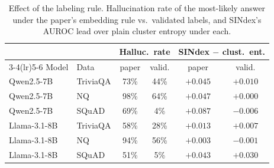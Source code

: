 \begin{table}[t]\centering
\caption{Effect of the labeling rule. Hallucination rate of the most-likely answer under the paper's embedding rule vs.\ validated labels, and SINdex's AUROC lead over plain cluster entropy under each.}
\label{tab:labeleffect}\small\setlength{\tabcolsep}{3.5pt}
\begin{tabular}{llcccc}\toprule
 & & \multicolumn{2}{c}{Halluc.\ rate} & \multicolumn{2}{c}{SINdex $-$ clust.\ ent.}\\
\cmidrule(lr){3-4}\cmidrule(lr){5-6}
Model & Data & paper & valid. & paper & valid.\\\midrule
Qwen2.5-7B & TriviaQA & 73\% & 44\% & $+0.045$ & $+0.010$\\
Qwen2.5-7B & NQ & 98\% & 64\% & $+0.047$ & $+0.000$\\
Qwen2.5-7B & SQuAD & 69\% & 4\% & $+0.087$ & $-0.006$\\
Llama-3.1-8B & TriviaQA & 58\% & 28\% & $+0.013$ & $+0.007$\\
Llama-3.1-8B & NQ & 94\% & 56\% & $+0.003$ & $-0.001$\\
Llama-3.1-8B & SQuAD & 51\% & 5\% & $+0.043$ & $+0.030$\\
\bottomrule\end{tabular}\end{table}